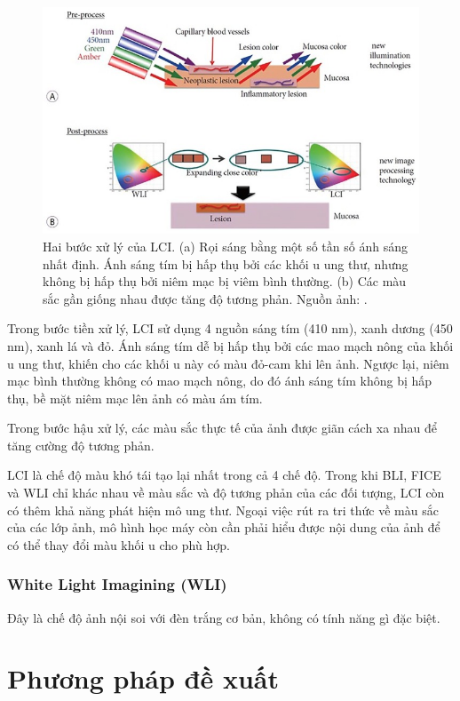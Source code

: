 \documentclass[12pt]{extreport}
\begin{document}
\begin{figure}[H]
    \centering
    \includegraphics[width=0.9\linewidth]{figure21.jpg}
    \caption{Hai bước xử lý của LCI. (a) Rọi sáng bằng một số tần số ánh sáng nhất định. Ánh sáng tím bị hấp thụ bởi các khối u ung thư, nhưng không bị hấp thụ bởi niêm mạc bị viêm bình thường. (b) Các màu sắc gần giống nhau được tăng độ tương phản. Nguồn ảnh: \cite{pmid31700545}.}
\end{figure}

Trong bước tiền xử lý, LCI sử dụng 4 nguồn sáng tím (410 nm), xanh dương (450 nm), xanh lá và đỏ. Ánh sáng tím dễ bị hấp thụ bởi các mao mạch nông của khối u ung thư, khiến cho các khối u này có màu đỏ-cam khi lên ảnh. Ngược lại, niêm mạc bình thường không có mao mạch nông, do đó ánh sáng tím không bị hấp thụ, bề mặt niêm mạc lên ảnh có màu ám tím.

Trong bước hậu xử lý, các màu sắc thực tế của ảnh được giãn cách xa nhau để tăng cường độ tương phản.

LCI là chế độ màu khó tái tạo lại nhất trong cả 4 chế độ. Trong khi BLI, FICE và WLI chỉ khác nhau về màu sắc và độ tương phản của các đối tượng, LCI còn có thêm khả năng phát hiện mô ung thư. Ngoại việc rút ra tri thức về màu sắc của các lớp ảnh, mô hình học máy còn cần phải hiểu được nội dung của ảnh để có thể thay đổi màu khối u cho phù hợp.

\subsection{White Light Imagining (WLI)}

Đây là chế độ ảnh nội soi với đèn trắng cơ bản, không có tính năng gì đặc biệt.

\chapter{Phương pháp đề xuất}
\end{document}
